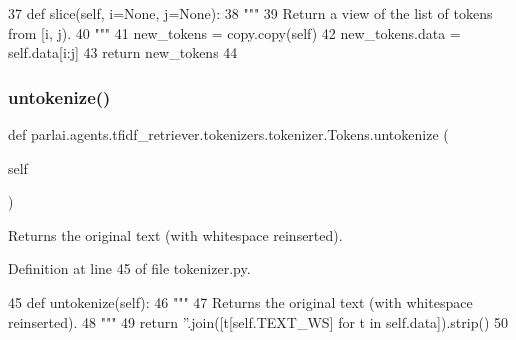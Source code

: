 \begin{DoxyCode}
37     \textcolor{keyword}{def }slice(self, i=None, j=None):
38         \textcolor{stringliteral}{"""}
39 \textcolor{stringliteral}{        Return a view of the list of tokens from [i, j).}
40 \textcolor{stringliteral}{        """}
41         new\_tokens = copy.copy(self)
42         new\_tokens.data = self.data[i:j]
43         \textcolor{keywordflow}{return} new\_tokens
44 
\end{DoxyCode}
\mbox{\label{classparlai_1_1agents_1_1tfidf__retriever_1_1tokenizers_1_1tokenizer_1_1Tokens_a1bea40b1ea8e1772fb8ae6c2157ee819}} 
\subsubsection{\texorpdfstring{untokenize()}{untokenize()}}
{\footnotesize\ttfamily def parlai.\+agents.\+tfidf\+\_\+retriever.\+tokenizers.\+tokenizer.\+Tokens.\+untokenize (\begin{DoxyParamCaption}\item[{}]{self }\end{DoxyParamCaption})}

\begin{DoxyVerb}Returns the original text (with whitespace reinserted).
\end{DoxyVerb}
 

Definition at line 45 of file tokenizer.\+py.


\begin{DoxyCode}
45     \textcolor{keyword}{def }untokenize(self):
46         \textcolor{stringliteral}{"""}
47 \textcolor{stringliteral}{        Returns the original text (with whitespace reinserted).}
48 \textcolor{stringliteral}{        """}
49         \textcolor{keywordflow}{return} \textcolor{stringliteral}{''}.join([t[self.TEXT\_WS] \textcolor{keywordflow}{for} t \textcolor{keywordflow}{in} self.data]).strip()
50 
\end{DoxyCode}
\mbox{\label{classparlai_1_1agents_1_1tfidf__retriever_1_1tokenizers_1_1tokenizer_1_1Tokens_a81b6d47a051c87c7f885a6f7db5ac891}} 
